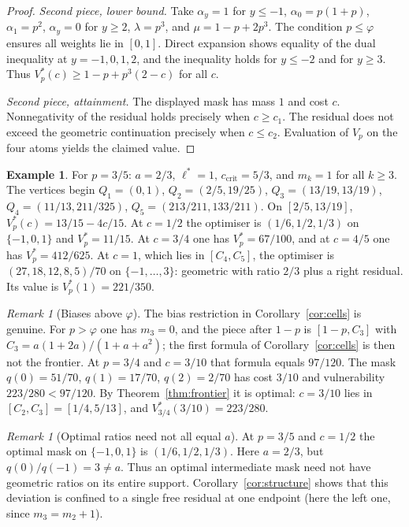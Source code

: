 \documentclass{article}
\theoremstyle{definition}
\newtheorem{example}[theorem]{Example}
\theoremstyle{remark}
\newtheorem{remark}[theorem]{Remark}
\newcommand{\ccrit}{c_{\mathrm{crit}}}
\begin{document}
\begin{proof}
\emph{Second piece, lower bound.} Take \(\alpha_y=1\) for \(y\le-1\), \(\alpha_0=p(1+p)\), \(\alpha_1=p^2\), \(\alpha_y=0\) for \(y\ge2\), \(\lambda=p^3\), and \(\mu=1-p+2p^3\). The condition \(p\le\varphi\) ensures all weights lie in \([0,1]\). Direct expansion shows equality of the dual inequality at \(y=-1,0,1,2\), and the inequality holds for \(y\le-2\) and for \(y\ge3\). Thus \(V_p^*(c)\ge1-p+p^3(2-c)\) for all \(c\).

\emph{Second piece, attainment.} The displayed mask has mass \(1\) and cost \(c\). Nonnegativity of the residual holds precisely when \(c\ge c_1\). The residual does not exceed the geometric continuation precisely when \(c\le c_2\). Evaluation of \(V_p\) on the four atoms yields the claimed value.
\end{proof}

\begin{example}
For \(p=3/5\): \(a=2/3\), \(\ell^*=1\), \(\ccrit=5/3\), and \(m_k=1\) for all \(k\ge3\). The vertices begin \(Q_1=(0,1)\), \(Q_2=(2/5,19/25)\), \(Q_3=(13/19,13/19)\), \(Q_4=(11/13,211/325)\), \(Q_5=(213/211,133/211)\). On \([2/5,13/19]\), \(V_p^*(c)=13/15-4c/15\). At \(c=1/2\) the optimiser is \((1/6,1/2,1/3)\) on \(\{-1,0,1\}\) and \(V_p^*=11/15\). At \(c=3/4\) one has \(V_p^*=67/100\), and at \(c=4/5\) one has \(V_p^*=412/625\). At \(c=1\), which lies in \([C_4,C_5]\), the optimiser is \((27,18,12,8,5)/70\) on \(\{-1,\dots,3\}\): geometric with ratio \(2/3\) plus a right residual. Its value is \(V_p^*(1)=221/350\).
\end{example}

\begin{remark}[Biases above \(\varphi\)]
The bias restriction in Corollary~\ref{cor:cells} is genuine. For \(p>\varphi\) one has \(m_3=0\), and the piece after \(1-p\) is \([1-p,C_3]\) with \(C_3=a(1+2a)/(1+a+a^2)\); the first formula of Corollary~\ref{cor:cells} is then not the frontier. At \(p=3/4\) and \(c=3/10\) that formula equals \(97/120\). The mask \(q(0)=51/70\), \(q(1)=17/70\), \(q(2)=2/70\) has cost \(3/10\) and vulnerability \(223/280<97/120\). By Theorem~\ref{thm:frontier} it is optimal: \(c=3/10\) lies in \([C_2,C_3]=[1/4,5/13]\), and \(V_{3/4}^*(3/10)=223/280\).
\end{remark}

\begin{remark}[Optimal ratios need not all equal \(a\)]
At \(p=3/5\) and \(c=1/2\) the optimal mask on \(\{-1,0,1\}\) is \((1/6,1/2,1/3)\). Here \(a=2/3\), but \(q(0)/q(-1)=3\neq a\). Thus an optimal intermediate mask need not have geometric ratios on its entire support. Corollary~\ref{cor:structure} shows that this deviation is confined to a single free residual at one endpoint (here the left one, since \(m_3=m_2+1\)).
\end{remark}
\end{document}
